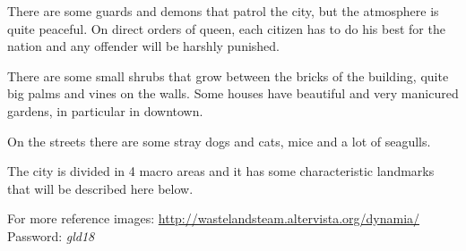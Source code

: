 There are some guards and demons that patrol the city, but the atmosphere is quite peaceful. On direct orders of queen, each citizen has to do his best for the nation and any offender will be harshly punished.

There are some small shrubs that grow between the bricks of the building, quite big palms and vines on the walls. Some houses have beautiful and very manicured gardens, in particular in downtown.

On the streets there are some stray dogs and cats, mice and a lot of seagulls.

The city is divided in 4 macro areas and it has some characteristic landmarks that will be described here below.

For more reference images: \url{http://wastelandsteam.altervista.org/dynamia/}\\
Password: \textit{gld18}
